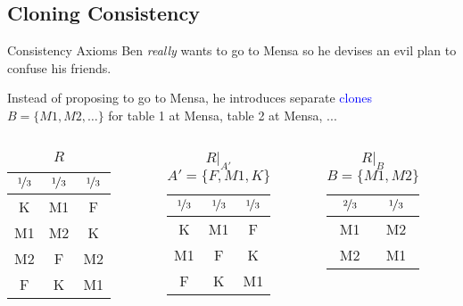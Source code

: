 \documentclass{beamer}
\theoremstyle{definition}
\def\b{\textcolor{blue}}
\begin{document}
\subsection{Cloning Consistency}

\begin{frame}{Consistency Axioms}
Ben \emph{really} wants to go to Mensa so he devises an evil plan to confuse his friends.\pause\par
Instead of proposing to go to Mensa, he introduces separate \b{clones} $B = \{M1, M2, \dots\}$ for table 1 at Mensa, table 2 at Mensa, ...\pause

\begin{columns}
\begin{column}{0.33\textwidth}
\begin{center}\begin{table}\begin{tabular}{ c|c|c }
 $\nicefrac{1}{3}$ & $\nicefrac{1}{3}$ & $\nicefrac{1}{3}$ \\
 \hline\hline
 K & M1 & F \\
 M1 & M2 & K \\
 M2 & F & M2 \\
 F & K & M1 \\
\end{tabular}\caption{$R$}\end{table}\end{center}
\end{column}\pause
\begin{column}{0.33\textwidth}
\begin{center}\begin{table}\begin{tabular}{ c|c|c }
 $\nicefrac{1}{3}$ & $\nicefrac{1}{3}$ & $\nicefrac{1}{3}$ \\
 \hline\hline
 K & M1 & F \\
 M1 & F & K \\
 F & K & M1 \\
\end{tabular}\caption{$R|_{A'}$ \\ $A' = \{F, M1, K\}$}\end{table}\end{center}
\end{column}
\begin{column}{0.33\textwidth}
\begin{center}\begin{table}\begin{tabular}{ c|c }
 $\nicefrac{2}{3}$ & $\nicefrac{1}{3}$ \\
 \hline\hline
 M1 & M2 \\
 M2 & M1 \\
\end{tabular}\caption{$R|_B$ \\ $B = \{M1, M2\}$}\end{table}\end{center}
\end{column}
\end{columns}\pause


\end{frame}
\end{document}
